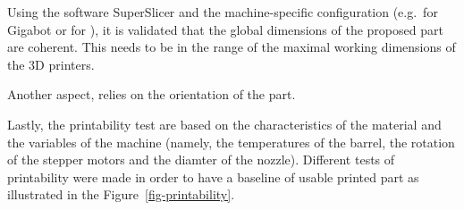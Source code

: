 \documentclass[
  11pt,
]{article}
\begin{document}
Using the software SuperSlicer and the machine-specific configuration
(e.g.~for Gigabot or for ), it is validated that the global dimensions
of the proposed part are coherent. This needs to be in the range of the
maximal working dimensions of the 3D printers.

Another aspect, relies on the orientation of the part.

Lastly, the printability test are based on the characteristics of the
material and the variables of the machine (namely, the temperatures of
the barrel, the rotation of the stepper motors and the diamter of the
nozzle). Different tests of printability were made in order to have a
baseline of usable printed part as illustrated in the
Figure~\ref{fig-printability}.

\begin{figure}

\begin{minipage}[t]{\linewidth}

{\centering 


}

\end{minipage}%
\newline
\begin{minipage}[t]{\linewidth}

{\centering 

}
\end{minipage}
\end{figure}
\end{document}
